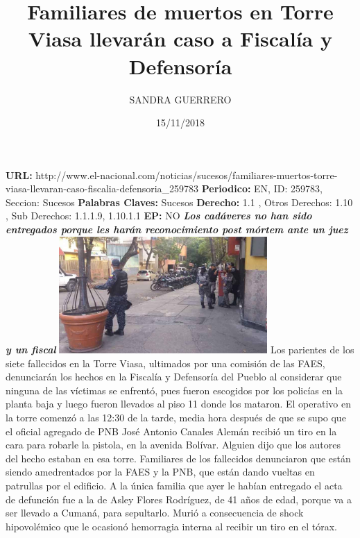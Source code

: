 \documentclass{article}%
\title{\textbf{Familiares de muertos en Torre Viasa llevarán caso a Fiscalía y Defensoría}}%
\author{SANDRA GUERRERO}%
\date{15/11/2018}%
\begin{document}
%
\normalsize%
\maketitle%
\textbf{URL: }%
http://www.el{-}nacional.com/noticias/sucesos/familiares{-}muertos{-}torre{-}viasa{-}llevaran{-}caso{-}fiscalia{-}defensoria\_259783\newline%
%
\textbf{Periodico: }%
EN, %
ID: %
259783, %
Seccion: %
Sucesos\newline%
%
\textbf{Palabras Claves: }%
Sucesos\newline%
%
\textbf{Derecho: }%
1.1%
, Otros Derechos: %
1.10%
, Sub Derechos: %
1.1.1.9, 1.10.1.1%
\newline%
%
\textbf{EP: }%
NO\newline%
\newline%
%
\textbf{\textit{Los cadáveres no han sido entregados porque les harán reconocimiento post mórtem ante un juez y un fiscal}}%
\newline%
\newline%
%
\includegraphics[width=300px]{204.jpg}%
\newline%
%
Los parientes de los siete fallecidos en la Torre Viasa, ultimados por una comisión de las FAES, denunciarán los hechos en la Fiscalía y Defensoría del Pueblo al considerar que ninguna de las víctimas se enfrentó, pues fueron escogidos por los policías en la planta baja y luego fueron llevados al piso 11 donde los mataron.%
\newline%
%
El operativo en la torre comenzó a las 12:30 de la tarde, media hora después de que se supo que el oficial agregado de PNB José Antonio Canales Alemán recibió un tiro en la cara para robarle la pistola, en la avenida Bolívar. Alguien dijo que los autores del hecho estaban en esa torre.%
\newline%
%
Familiares de los fallecidos denunciaron que están siendo amedrentados por la FAES y la PNB, que están dando vueltas en patrullas por el edificio.%
\newline%
%
A la única familia que ayer le habían entregado el acta de defunción fue a la de Asley Flores Rodríguez, de 41 años de edad, porque va a ser llevado a Cumaná, para sepultarlo. Murió a consecuencia de shock hipovolémico que le ocasionó hemorragia interna al recibir un tiro en el tórax.%
\end{document}
